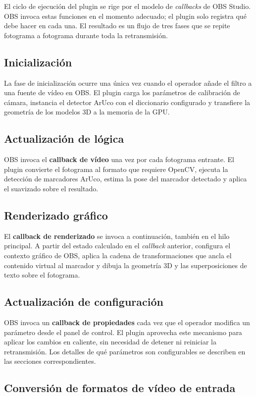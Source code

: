 El ciclo de ejecución del plugin se rige por el modelo de \textit{callbacks} de OBS Studio. OBS invoca estas funciones en el momento adecuado; el plugin solo registra qué debe hacer en cada una. El resultado es un flujo de tres fases que se repite fotograma a fotograma durante toda la retransmisión.

\subsection{Inicialización}
La fase de inicialización ocurre una única vez cuando el operador añade el filtro a una fuente de vídeo en OBS. El plugin carga los parámetros de calibración de cámara, instancia el detector ArUco con el diccionario configurado y transfiere la geometría de los modelos 3D a la memoria de la GPU.

\subsection{Actualización de lógica}
OBS invoca el \textbf{callback de vídeo} una vez por cada fotograma entrante. El plugin convierte el fotograma al formato que requiere OpenCV, ejecuta la detección de marcadores ArUco, estima la pose del marcador detectado y aplica el suavizado sobre el resultado.

\subsection{Renderizado gráfico}
El \textbf{callback de renderizado} se invoca a continuación, también en el hilo principal. A partir del estado calculado en el \textit{callback} anterior, configura el contexto gráfico de OBS, aplica la cadena de transformaciones que ancla el contenido virtual al marcador y dibuja la geometría 3D y las superposiciones de texto sobre el fotograma.

\subsection{Actualización de configuración}
OBS invoca un \textbf{callback de propiedades} cada vez que el operador modifica un parámetro desde el panel de control. El plugin aprovecha este mecanismo para aplicar los cambios en caliente, sin necesidad de detener ni reiniciar la retransmisión. Los detalles de qué parámetros son configurables se describen en las secciones correspondientes.
\subsection{Conversión de formatos de vídeo de entrada}
\label{subsubsec:formatos}


